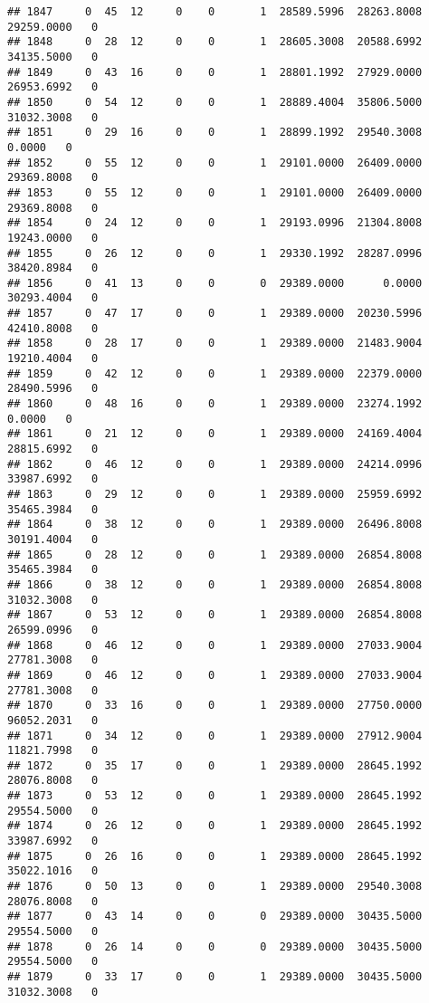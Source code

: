 \documentclass[
]{article}
\begin{document}
\begin{enumerate}
\begin{verbatim}
## 1847     0  45  12     0    0       1  28589.5996  28263.8008  29259.0000   0
## 1848     0  28  12     0    0       1  28605.3008  20588.6992  34135.5000   0
## 1849     0  43  16     0    0       1  28801.1992  27929.0000  26953.6992   0
## 1850     0  54  12     0    0       1  28889.4004  35806.5000  31032.3008   0
## 1851     0  29  16     0    0       1  28899.1992  29540.3008      0.0000   0
## 1852     0  55  12     0    0       1  29101.0000  26409.0000  29369.8008   0
## 1853     0  55  12     0    0       1  29101.0000  26409.0000  29369.8008   0
## 1854     0  24  12     0    0       1  29193.0996  21304.8008  19243.0000   0
## 1855     0  26  12     0    0       1  29330.1992  28287.0996  38420.8984   0
## 1856     0  41  13     0    0       0  29389.0000      0.0000  30293.4004   0
## 1857     0  47  17     0    0       1  29389.0000  20230.5996  42410.8008   0
## 1858     0  28  17     0    0       1  29389.0000  21483.9004  19210.4004   0
## 1859     0  42  12     0    0       1  29389.0000  22379.0000  28490.5996   0
## 1860     0  48  16     0    0       1  29389.0000  23274.1992      0.0000   0
## 1861     0  21  12     0    0       1  29389.0000  24169.4004  28815.6992   0
## 1862     0  46  12     0    0       1  29389.0000  24214.0996  33987.6992   0
## 1863     0  29  12     0    0       1  29389.0000  25959.6992  35465.3984   0
## 1864     0  38  12     0    0       1  29389.0000  26496.8008  30191.4004   0
## 1865     0  28  12     0    0       1  29389.0000  26854.8008  35465.3984   0
## 1866     0  38  12     0    0       1  29389.0000  26854.8008  31032.3008   0
## 1867     0  53  12     0    0       1  29389.0000  26854.8008  26599.0996   0
## 1868     0  46  12     0    0       1  29389.0000  27033.9004  27781.3008   0
## 1869     0  46  12     0    0       1  29389.0000  27033.9004  27781.3008   0
## 1870     0  33  16     0    0       1  29389.0000  27750.0000  96052.2031   0
## 1871     0  34  12     0    0       1  29389.0000  27912.9004  11821.7998   0
## 1872     0  35  17     0    0       1  29389.0000  28645.1992  28076.8008   0
## 1873     0  53  12     0    0       1  29389.0000  28645.1992  29554.5000   0
## 1874     0  26  12     0    0       1  29389.0000  28645.1992  33987.6992   0
## 1875     0  26  16     0    0       1  29389.0000  28645.1992  35022.1016   0
## 1876     0  50  13     0    0       1  29389.0000  29540.3008  28076.8008   0
## 1877     0  43  14     0    0       0  29389.0000  30435.5000  29554.5000   0
## 1878     0  26  14     0    0       0  29389.0000  30435.5000  29554.5000   0
## 1879     0  33  17     0    0       1  29389.0000  30435.5000  31032.3008   0

\end{verbatim}
\end{enumerate}
\end{document}
